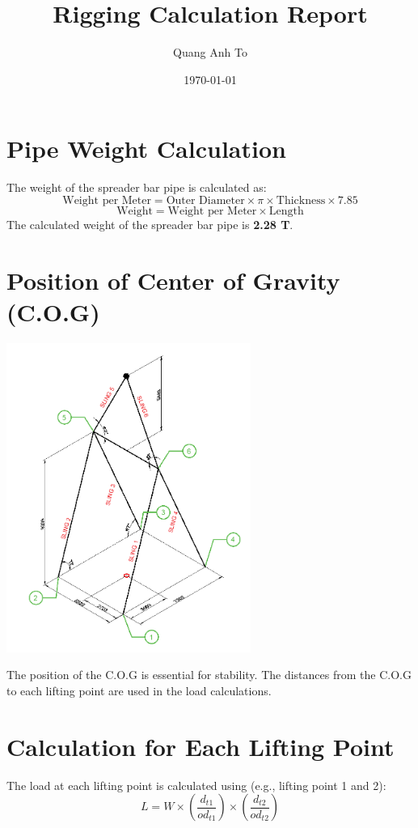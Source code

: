 \documentclass[12pt]{article}
\title{Rigging Calculation Report}
\author{Quang Anh To}
\date{\today}
\begin{document}
\maketitle

\tableofcontents

\pagebreak

\section{Pipe Weight Calculation}
The weight of the spreader bar pipe is calculated as:
\[
\text{Weight per Meter} = \text{Outer Diameter} \times \pi \times \text{Thickness} \times 7.85
\]
\[
\text{Weight} = \text{Weight per Meter} \times \text{Length}
\]
The calculated weight of the spreader bar pipe is \textbf{2.28 T}.

\section{Position of Center of Gravity (C.O.G)}
\begin{center}
\includegraphics[width=0.6\textwidth]{image-3.png}
\end{center}
The position of the C.O.G is essential for stability. The distances from the C.O.G to each lifting point are used in the load calculations.

\section{Calculation for Each Lifting Point}
The load at each lifting point is calculated using (e.g., lifting point 1 and 2):
\[
L = W \times \left( \frac{d_{t1}}{od_{t1}} \right) \times \left( \frac{d_{t2}}{od_{t2}} \right)
\]
\end{document}
